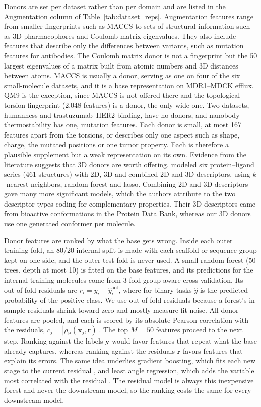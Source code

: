 Donors are set per dataset rather than per domain and are listed in the Augmentation column of Table~\ref{tab:dataset_reps}. Augmentation features range from smaller fingerprints such as MACCS to sets of structural information such as 3D pharmacophores and Coulomb matrix eigenvalues. They also include features that describe only the differences between variants, such as mutation features for antibodies. The Coulomb matrix donor is not a fingerprint but the 50 largest eigenvalues of a matrix built from atomic numbers and 3D distances between atoms. MACCS is usually a donor, serving as one on four of the six small-molecule datasets, and it is a base representation on MDR1--MDCK efflux. QM9 is the exception, since MACCS is not offered there and the topological torsion fingerprint (2,048 features) is a donor, the only wide one. Two datasets, humanness and trastuzumab--HER2 binding, have no donors, and nanobody thermostability has one, mutation features. Each donor is small, at most 167 features apart from the torsions, or describes only one aspect such as shape, charge, the mutated positions or one tumor property. Each is therefore a plausible supplement but a weak representation on its own. Evidence from the literature suggests that 3D donors are worth offering. \citet{Bahia2023} modeled six protein--ligand series (461 structures) with 2D, 3D and combined 2D and 3D descriptors, using $k$-nearest neighbors, random forest and lasso. Combining 2D and 3D descriptors gave many more significant models, which the authors attribute to the two descriptor types coding for complementary properties. Their 3D descriptors came from bioactive conformations in the Protein Data Bank, whereas our 3D donors use one generated conformer per molecule.

Donor features are ranked by what the base gets wrong. Inside each outer training fold, an 80/20 internal split is made with each scaffold or sequence group kept on one side, and the outer test fold is never used. A small random forest (50 trees, depth at most 10) is fitted on the base features, and its predictions for the internal-training molecules come from 3-fold group-aware cross-validation. Its out-of-fold residuals are $r_i = y_i - \hat{y}^{\mathrm{oof}}_i$, where for binary tasks $\hat{y}$ is the predicted probability of the positive class. We use out-of-fold residuals because a forest's in-sample residuals shrink toward zero and mostly measure fit noise. All donor features are pooled, and each is scored by its absolute Pearson correlation with the residuals, $c_j = |\rho_{\mathrm{P}}(\mathbf{x}_j, \mathbf{r})|$. The top $M = 50$ features proceed to the next step. Ranking against the labels $\mathbf{y}$ would favor features that repeat what the base already captures, whereas ranking against the residuals $\mathbf{r}$ favors features that explain its errors. The same idea underlies gradient boosting, which fits each new stage to the current residual \citep{friedman2001greedy}, and least angle regression, which adds the variable most correlated with the residual \citep{efron2004lars}. The residual model is always this inexpensive forest and never the downstream model, so the ranking costs the same for every downstream model.

